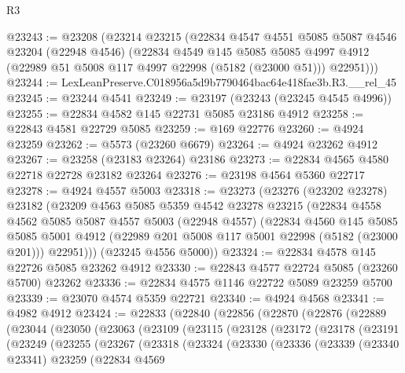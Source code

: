 \begin{lexlean}{R3}
\begin{coremodule}
@23243 := @23208
    (@23214
      @23215
      (@22834
        @4547
        @4551
        @5085
        @5087
        @4546
        @23204
        (@22948 @4546)
        (@22834
          @4549
          @145
          @5085
          @5085
          @4997
          @4912
          (@22989 @51 @5008 @117 @4997 @22998 (@5182 (@23000 @51)))
          @22951)))
@23244 := LexLeanPreserve.C018956a5d9b7790464bac64e418fae3b.R3.__rel_45
@23245 := @23244 @4541
@23249 := @23197 (@23243 (@23245 @4545 @4996))
@23255 := @22834 @4582 @145 @22731 @5085 @23186 @4912
@23258 := @22843 @4581 @22729 @5085
@23259 := @169 @22776
@23260 := @4924 @23259
@23262 := @5573 (@23260 @6679)
@23264 := @4924 @23262 @4912
@23267 := @23258 (@23183 @23264) @23186
@23273 := @22834 @4565 @4580 @22718 @22728 @23182 @23264
@23276 := @23198 @4564 @5360 @22717
@23278 := @4924 @4557 @5003
@23318 := @23273
    (@23276
      (@23202 @23278)
      @23182
      (@23209
        @4563
        @5085
        @5359
        @4542
        @23278
        @23215
        (@22834
          @4558
          @4562
          @5085
          @5087
          @4557
          @5003
          (@22948 @4557)
          (@22834
            @4560
            @145
            @5085
            @5085
            @5001
            @4912
            (@22989 @201 @5008 @117 @5001 @22998 (@5182 (@23000 @201)))
            @22951)))
      (@23245 @4556 @5000))
@23324 := @22834 @4578 @145 @22726 @5085 @23262 @4912
@23330 := @22843 @4577 @22724 @5085 (@23260 @5700) @23262
@23336 := @22834 @4575 @1146 @22722 @5089 @23259 @5700
@23339 := @23070 @4574 @5359 @22721
@23340 := @4924 @4568
@23341 := @4982 @4912
@23424 := @22833
    (@22840
      (@22856
        (@22870
          (@22876
            (@22889
              (@23044
                (@23050
                  (@23063
                    (@23109
                      (@23115
                        (@23128
                          (@23172
                            (@23178
                              (@23191
                                (@23249
                                  (@23255
                                    (@23267
                                      (@23318
                                        (@23324
                                          (@23330
                                            (@23336
                                              (@23339
                                                (@23340 @23341)
                                                @23259
                                                (@22834
                                                  @4569

\end{coremodule}
\end{lexlean}
